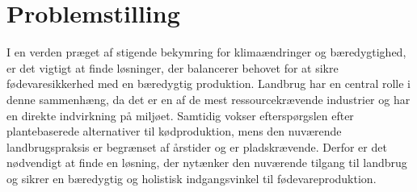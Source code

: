 \newpage
\section{Problemstilling}

I en verden præget af stigende bekymring for klimaændringer og bæredygtighed, er det vigtigt at finde løsninger, der balancerer behovet for at sikre fødevaresikkerhed med en bæredygtig produktion. Landbrug har en central rolle i denne sammenhæng, da det er en af de mest ressourcekrævende industrier og har en direkte indvirkning på miljøet. Samtidig vokser efterspørgslen efter plantebaserede alternativer til kødproduktion, mens den nuværende landbrugspraksis er begrænset af årstider og er pladskrævende. Derfor er det nødvendigt at finde en løsning, der nytænker den nuværende tilgang til landbrug og sikrer en bæredygtig og holistisk indgangsvinkel til fødevareproduktion.

